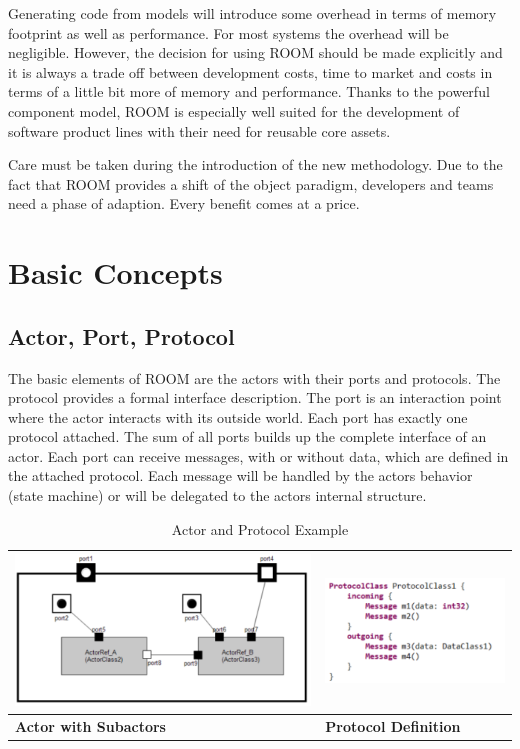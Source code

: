 Generating code from models will introduce some overhead in terms of memory footprint as well as performance.
For most systems the overhead will be negligible. However, the decision for using ROOM should be made explicitly
and it is always a trade off between development costs, time to market and costs in terms of a little bit more of
memory and performance. Thanks to the powerful component model, ROOM is especially well suited for the development
of software product lines with their need for reusable core assets.  
  
Care must be taken during the introduction of the new methodology. Due to the fact that ROOM provides a shift of the
object paradigm, developers and teams need a phase of adaption. Every benefit comes at a price.

\section{Basic Concepts}

\subsection{Actor, Port, Protocol}

The basic elements of ROOM are the actors with their ports and protocols.
The protocol provides a formal interface description. The port is an interaction
point where the actor interacts with its outside world. Each port has exactly one protocol
attached. The sum of all ports builds up the complete interface of an actor.
Each port can receive messages, with or without data, which are defined in the attached protocol.
Each message will be handled by the actors behavior (state machine) or will be delegated to the actors internal structure.

\begin{table}
\caption{Actor and Protocol Example}
\begin{tabular}{|l|l|}
\hline
\includegraphics[scale=0.85]{images/040-ActorClass.png} & \includegraphics[scale=0.85]{images/040-ProtocolClassTextualNotation.png} \\ \hline
\textbf{Actor with Subactors} & \textbf{Protocol Definition} \\ \hline
\end{tabular}
\end{table}

